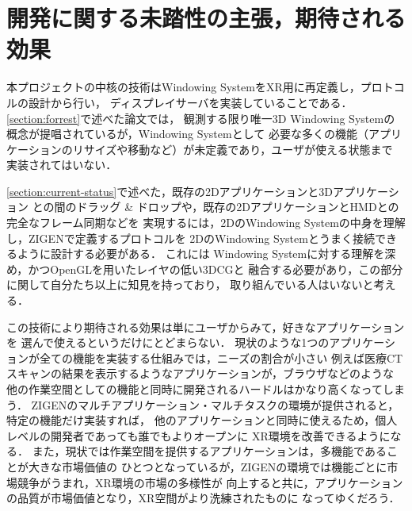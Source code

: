 \section{開発に関する未踏性の主張，期待される効果}

本プロジェクトの中核の技術はWindowing SystemをXR用に再定義し，プロトコルの設計から行い，
ディスプレイサーバを実装していることである．\ref{section:forrest}で述べた論文では，
観測する限り唯一3D Windowing Systemの概念が提唱されているが，Windowing Systemとして
必要な多くの機能（アプリケーションのリサイズや移動など）が未定義であり，ユーザが使える状態まで
実装されてはいない．

\ref{section:current-status}で述べた，既存の2Dアプリケーションと3Dアプリケーション
との間のドラッグ \& ドロップや，既存の2DアプリケーションとHMDとの完全なフレーム同期などを
実現するには，2DのWindowing Systemの中身を理解し，ZIGENで定義するプロトコルを
2DのWindowing Systemとうまく接続できるように設計する必要がある．
これには Windowing Systemに対する理解を深め，かつOpenGLを用いたレイヤの低い3DCGと
融合する必要があり，この部分に関して自分たち以上に知見を持っており，
取り組んでいる人はいないと考える．

この技術により期待される効果は単にユーザからみて，好きなアプリケーションを
選んで使えるというだけにとどまらない．
現状のような1つのアプリケーションが全ての機能を実装する仕組みでは，ニーズの割合が小さい
例えば医療CTスキャンの結果を表示するようなアプリケーションが，ブラウザなどのような
他の作業空間としての機能と同時に開発されるハードルはかなり高くなってしまう．
ZIGENのマルチアプリケーション・マルチタスクの環境が提供されると，特定の機能だけ実装すれば，
他のアプリケーションと同時に使えるため，個人レベルの開発者であっても誰でもよりオープンに
XR環境を改善できるようになる．
また，現状では作業空間を提供するアプリケーションは，多機能であることが大きな市場価値の
ひとつとなっているが，ZIGENの環境では機能ごとに市場競争がうまれ，XR環境の市場の多様性が
向上すると共に，アプリケーションの品質が市場価値となり，XR空間がより洗練されたものに
なってゆくだろう．

